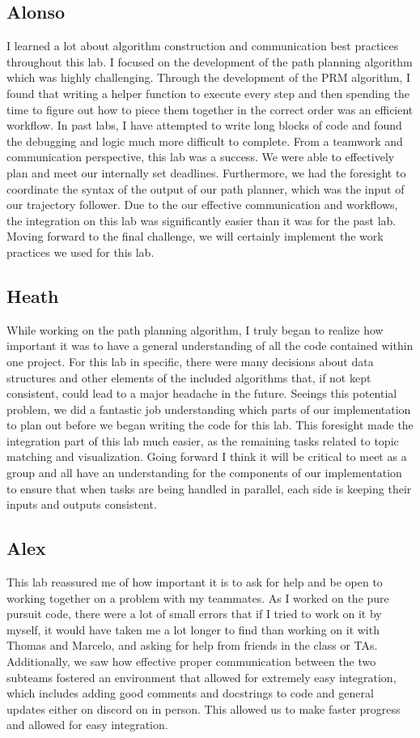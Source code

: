 \documentclass{article}
\begin{document}
\subsection{Alonso}
I learned a lot about algorithm construction and communication best practices throughout this lab. I focused on the development of the path planning algorithm which was highly challenging. Through the development of the PRM algorithm, I found that writing a helper function to execute every step and then spending the time to figure out how to piece them together in the correct order was an efficient workflow. In past labs, I have attempted to write long blocks of code and found the debugging and logic much more difficult to complete. From a teamwork and communication perspective, this lab was a success. We were able to effectively plan and meet our internally set deadlines. Furthermore, we had the foresight to coordinate the syntax of the output of our path planner, which was the input of our trajectory follower. Due to the our effective communication and workflows, the integration on this lab was significantly easier than it was for the past lab. Moving forward to the final challenge, we will certainly implement the work practices we used for this lab.



\subsection{Heath}
While working on the path planning algorithm, I truly began to realize how important it was to have a general understanding of all the code contained within one project. For this lab in specific, there were many decisions about data structures and other elements of the included algorithms that, if not kept consistent, could lead to a major headache in the future. Seeings this potential problem, we did a fantastic job understanding which parts of our implementation to plan out before we began writing the code for this lab. This foresight made the integration part of this lab much easier, as the remaining tasks related to topic matching and visualization. Going forward I think it will be critical to meet as a group and all have an understanding for the components of our implementation to ensure that when tasks are being handled in parallel, each side is keeping their inputs and outputs consistent.

\subsection{Alex}
This lab reassured me of how important it is to ask for help and be open to working together on a problem with my teammates. As I worked on the pure pursuit code, there were a lot of small errors that if I tried to work on it by myself, it would have taken me a lot longer to find than working on it with Thomas and Marcelo, and asking for help from friends in the class or TAs. Additionally, we saw how effective proper communication between the two subteams fostered an environment that allowed for extremely easy integration, which includes adding good comments and docstrings to code and general updates either on discord on in person. This allowed us to make faster progress and allowed for easy integration.
\end{document}
